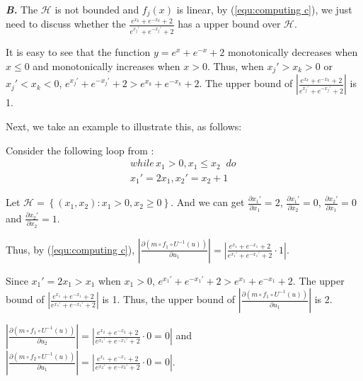 \textbf{\emph{B.}} The $\mathcal{H}$ is not bounded and ${f_j}(x)$ is linear, by (\ref{equ:computing c}), we just need to discuss whether the ${\frac{{{e^{{x_k}}} + {e^{ - {x_k}}} + 2}}{{{e^{{x_{j}'}}} + {e^{ - {x_{j}'}}} + 2}}}$ has a upper bound over $\mathcal{H}$.

It is easy to see that the function $y = {e^x} + {e^{ - x}} + 2$ monotonically decreases when $x \le 0$ and monotonically increases when $x > 0$. Thus, when $x_{j}'>x_k>0$ or $x_{j}' < x_k < 0$, ${{e^{x_{j}'}} + {e^{ - {x_{j}'}}} + 2} > {{e^{{x_k}}} + {e^{ - {x_k}}} + 2}$. The upper bound of $\left| {\frac{{{e^{{x_k}}} + {e^{ - {x_k}}} + 2}}{{{e^{{x_{j}'}}} + {e^{ - {x_{j}'}}} + 2}}} \right|$ is 1. 

Next, we take an example to illustrate this, as follows:
\begin{exam}\label{exm5}
	Consider the following loop from \cite{ben2017multiphase}:
	$$\begin{array}{l}
	while\,{x_1} > 0,{x_1} \le {x_2}\;\;do\,\\
	{{x_1}'} = 2{x_1},{{x_2}'} = {x_2} + 1
	\end{array}$$
	
	Let $\mathcal{H} =\left\{ {({x_1},{x_2}):{x_1} > 0,{x_2} \ge 0} \right\}$. And we can get $\frac{{\partial {{x_1}'}}}{{\partial {x_1}}} = 2$, $\frac{{\partial {{x_1}'}}}{{\partial {x_2}}} = 0$, $\frac{{\partial {{x_2}'}}}{{\partial {x_1}}} = 0$ and $\frac{{\partial {{x_2}'}}}{{\partial {x_2}}} = 1$.
	
	Thus, by (\ref{equ:computing c}), 
	$\left| {\frac{{\partial (m \circ {f_1} \circ {U^{ - 1}}(u))}}{{\partial {u_1}}}} \right| = \left| {\frac{{{e^{{x_1}}} + {e^{ - {x_1}}} + 2}}{{{e^{{x_1}' }} + {e^{ - {x_1}' }} + 2}}\cdot 1} \right|.$
	
	Since $x_{1}'=2x_1>x_1$ when $x_1>0$, ${{e^{x_{1}'}} + {e^{ - {x_{1}'}}} + 2} > {{e^{{x_1}}} + {e^{ - {x_1}}} + 2}$. The upper bound of $\left| {\frac{{{e^{{x_1}}} + {e^{ - {x_1}}} + 2}}{{{e^{{x_{1}'}}} + {e^{ - {x_{1}'}}} + 2}}} \right|$ is 1. Thus, the upper bound of $\left| {\frac{{\partial (m \circ {f_1} \circ {U^{ - 1}}(u))}}{{\partial {u_1}}}} \right|$ is 2.
	
	$\left| {\frac{{\partial (m \circ {f_1} \circ {U^{ - 1}}(u))}}{{\partial {u_2}}}} \right| = \left| {\frac{{{e^{{x_2}}} + {e^{ - {x_2}}} + 2}}{{{e^{{x_1}' }} + {e^{ - {x_1}' }} + 2}}\cdot 0} =0\right|$
	and
	$\left| {\frac{{\partial (m \circ {f_2} \circ {U^{ - 1}}(u))}}{{\partial {u_1}}}} \right| = \left| {\frac{{{e^{{x_1}}} + {e^{ - {x_1}}} + 2}}{{{e^{{x_2}' }} + {e^{ - {x_2}' }} + 2}}\cdot 0} =0\right|.$
	

\end{exam}
